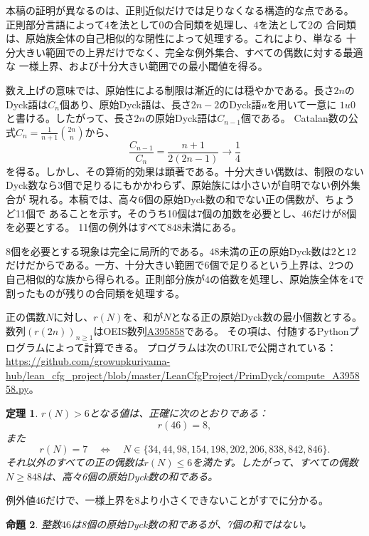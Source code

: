 \documentclass[12pt]{ltjsarticle}
\theoremstyle{plain}
\newtheorem{theorem}{定理}
\newtheorem{proposition}[theorem]{命題}
\newcommand{\seqnum}[1]{\href{https://oeis.org/#1}{\textnormal{\underline{#1}}}}
\begin{document}
本稿の証明が異なるのは、正則近似だけでは足りなくなる構造的な点である。
正則部分言語によって$4$を法として$0$の合同類を処理し、$4$を法として$2$の
合同類は、原始族全体の自己相似的な閉性によって処理する。これにより、単なる
十分大きい範囲での上界だけでなく、完全な例外集合、すべての偶数に対する最適な
一様上界、および十分大きい範囲での最小閾値を得る。

数え上げの意味では、原始性による制限は漸近的には穏やかである。長さ$2n$の
Dyck語は$C_n$個あり、原始Dyck語は、長さ$2n-2$のDyck語$u$を用いて一意に
$1u0$と書ける。したがって、長さ$2n$の原始Dyck語は$C_{n-1}$個である。
Catalan数の公式$C_n=\frac1{n+1}\binom{2n}{n}$から、
\[
 \frac{C_{n-1}}{C_n}=\frac{n+1}{2(2n-1)}\longrightarrow\frac14
\]
を得る。しかし、その算術的効果は顕著である。十分大きい偶数は、制限のない
Dyck数なら3個で足りるにもかかわらず、原始族には小さいが自明でない例外集合が
現れる。本稿では、高々6個の原始Dyck数の和でない正の偶数が、ちょうど11個で
あることを示す。そのうち10個は7個の加数を必要とし、$46$だけが8個を必要とする。
11個の例外はすべて$848$未満にある。

8個を必要とする現象は完全に局所的である。$48$未満の正の原始Dyck数は$2$と$12$
だけだからである。一方、十分大きい範囲で6個で足りるという上界は、2つの
自己相似的な族から得られる。正則部分族が$4$の倍数を処理し、原始族全体を$4$で
割ったものが残りの合同類を処理する。

正の偶数$N$に対し、$r(N)$を、和が$N$となる正の原始Dyck数の最小個数とする。
数列$(r(2n))_{n\geq1}$はOEIS数列\seqnum{A395858}である\cite{OEIS}。
その項は、付随するPythonプログラムによって計算できる。
プログラムは次のURLで公開されている：
\url{https://github.com/growupkuriyama-hub/lean_cfg_project/blob/master/LeanCfgProject/PrimDyck/compute_A395858.py}。

\begin{theorem}\label{thm:main}
$r(N)>6$となる値は、正確に次のとおりである：
\[
 r(46)=8,
\]
また
\[
 r(N)=7
 \quad\Longleftrightarrow\quad
 N\in\{34,44,98,154,198,202,206,838,842,846\}.
\]
それ以外のすべての正の偶数は$r(N)\leq6$を満たす。したがって、すべての偶数
$N\geq848$は、高々6個の原始Dyck数の和である。
\end{theorem}

例外値$46$だけで、一様上界を8より小さくできないことがすでに分かる。

\begin{proposition}\label{prop:46}
整数$46$は8個の原始Dyck数の和であるが、7個の和ではない。
\end{proposition}
\end{document}
